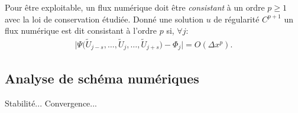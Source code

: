 \begin{definition}
    Pour être exploitable, un flux numérique doit être \textit{consistant} à un ordre $p\geq 1$ avec la loi de conservation étudiée.
    Donné une solution $u$ de régularité $C^{p+1}$ un flux numérique est dit consistant à l'ordre $p$ si, $\forall j$:
    \begin{align}
        \vert \Psi \bigl(\tilde U_{j-s} , \ldots ,\tilde U_j, \ldots , \tilde U_{j+s}\bigr) -  \Phi_j \vert = O(\Delta x^p).
    \end{align}
\end{definition}


\subsection{Analyse de schéma numériques}
Stabilité... Convergence...
\begin{definition}
\end{definition}
\begin{definition}
\end{definition}